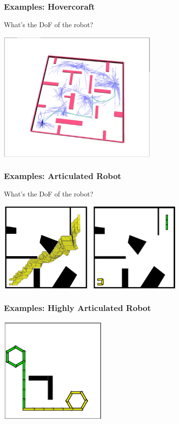 \documentclass[10pt]{article}
\begin{document}
\subsubsection*{Examples: Hovercoraft}
What's the DoF of the robot?
\begin{center} 
    \includegraphics*[width=0.6\textwidth]{L1_17.png} 
\end{center}

\subsubsection*{Examples: Articulated Robot}
What's the DoF of the robot?
\begin{center} 
    \includegraphics*[width=0.7\textwidth]{L1_18.png} 
\end{center}

\subsubsection*{Examples: Highly Articulated Robot}
\begin{center} 
    \includegraphics*[width=0.4\textwidth]{L1_19.png} 
\end{center}
\end{document}
